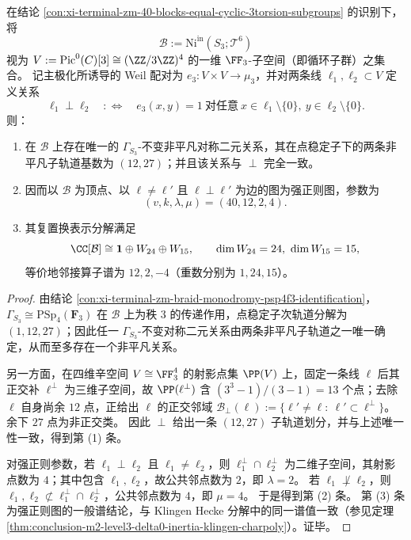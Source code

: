\begin{theorem}[块轨道的辛正交刻画与强正则结构]\label{thm:xi-terminal-zm-block-orbits-symplectic-orthogonality-srg}
在结论 \ref{con:xi-terminal-zm-40-blocks-equal-cyclic-3torsion-subgroups} 的识别下，将
\[
\mathcal B:=\mathrm{Ni}^{\mathrm{in}}(S_3;\mathcal T^6)
\]
视为 \(V:=\mathrm{Pic}^0(C)[3]\cong (\ZZ/3\ZZ)^4\) 的一维 \(\FF_3\)-子空间（即循环子群）之集合。
记主极化所诱导的 Weil 配对为 \(e_3:V\times V\to\mu_3\)，并对两条线 \(\ell_1,\ell_2\subset V\) 定义关系
\[
\ell_1\perp \ell_2
\quad:\Longleftrightarrow\quad
e_3(x,y)=1\ \text{对任意}\ x\in\ell_1\setminus\{0\},\ y\in\ell_2\setminus\{0\}.
\]
则：
\begin{enumerate}
  \item 在 \(\mathcal B\) 上存在唯一的 \(\Gamma_{S_3}\)-不变非平凡对称二元关系，其在点稳定子下的两条非平凡子轨道基数为 \((12,27)\)；并且该关系与 \(\perp\) 完全一致。
  \item 因而以 \(\mathcal B\) 为顶点、以 \(\ell\neq\ell'\) 且 \(\ell\perp\ell'\) 为边的图为强正则图，参数为
  \[
  (v,k,\lambda,\mu)=(40,12,2,4).
  \]
  \item 其复置换表示分解满足
  \[
  \CC[\mathcal B]\cong \mathbf 1\oplus W_{24}\oplus W_{15},
  \qquad
  \dim W_{24}=24,\ \dim W_{15}=15,
  \]
  等价地邻接算子谱为 \(12,2,-4\)（重数分别为 \(1,24,15\)）。
\end{enumerate}
\end{theorem}

\begin{proof}
由结论 \ref{con:xi-terminal-zm-braid-monodromy-psp4f3-identification}，\(\Gamma_{S_3}\cong \mathrm{PSp}_4(\mathbf F_3)\) 在 \(\mathcal B\) 上为秩 \(3\) 的传递作用，点稳定子次轨道分解为 \((1,12,27)\)；因此任一 \(\Gamma_{S_3}\)-不变对称二元关系由两条非平凡子轨道之一唯一确定，从而至多存在一个非平凡关系。
\par
另一方面，在四维辛空间 \(V\cong\FF_3^4\) 的射影点集 \(\PP(V)\) 上，固定一条线 \(\ell\) 后其正交补 \(\ell^\perp\) 为三维子空间，故 \(\PP(\ell^\perp)\) 含
\(
(3^3-1)/(3-1)=13
\)
个点；去除 \(\ell\) 自身尚余 \(12\) 点，正给出 \(\ell\) 的正交邻域
\(
\mathcal B_\perp(\ell):=\{\ell'\neq\ell:\ \ell'\subset\ell^\perp\}
\)。
余下 \(27\) 点为非正交类。
因此 \(\perp\) 给出一条 \((12,27)\) 子轨道划分，并与上述唯一性一致，得到第 (1) 条。
\par
对强正则参数，若 \(\ell_1\perp\ell_2\) 且 \(\ell_1\neq\ell_2\)，则 \(\ell_1^\perp\cap \ell_2^\perp\) 为二维子空间，其射影点数为 \(4\)；其中包含 \(\ell_1,\ell_2\)，故公共邻点数为 \(2\)，即 \(\lambda=2\)。
若 \(\ell_1\not\perp\ell_2\)，则 \(\ell_1,\ell_2\not\subset \ell_1^\perp\cap\ell_2^\perp\)，公共邻点数为 \(4\)，即 \(\mu=4\)。
于是得到第 (2) 条。
第 (3) 条为强正则图的一般谱结论，与 Klingen Hecke 分解中的同一谱值一致（参见定理 \ref{thm:conclusion-m2-level3-delta0-inertia-klingen-charpoly}）。证毕。
\end{proof}

